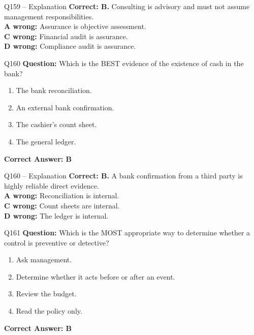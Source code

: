 \documentclass[aspectratio=169,10pt]{beamer}
\begin{document}
	\begin{frame}[t]{Q159 -- Explanation}
		\small
		\textbf{Correct: B.} Consulting is advisory and must not assume management responsibilities. \\[4pt]
		\textbf{A wrong:} Assurance is objective assessment. \\[2pt]
		\textbf{C wrong:} Financial audit is assurance. \\[2pt]
		\textbf{D wrong:} Compliance audit is assurance.
	\end{frame}
	
	\begin{frame}[t]{Q160}
		\small
		\textbf{Question:} Which is the BEST evidence of the existence of cash in the bank?
		\begin{enumerate}[label=\Alph*.,itemsep=1pt,topsep=2pt]
			\item The bank reconciliation.
			\item An external bank confirmation.
			\item The cashier's count sheet.
			\item The general ledger.
		\end{enumerate}
		\vspace{4pt}
		\textbf{Correct Answer: B}
	\end{frame}
	
	\begin{frame}[t]{Q160 -- Explanation}
		\small
		\textbf{Correct: B.} A bank confirmation from a third party is highly reliable direct evidence. \\[4pt]
		\textbf{A wrong:} Reconciliation is internal. \\[2pt]
		\textbf{C wrong:} Count sheets are internal. \\[2pt]
		\textbf{D wrong:} The ledger is internal.
	\end{frame}
	
	\begin{frame}[t]{Q161}
		\small
		\textbf{Question:} Which is the MOST appropriate way to determine whether a control is preventive or detective?
		\begin{enumerate}[label=\Alph*.,itemsep=1pt,topsep=2pt]
			\item Ask management.
			\item Determine whether it acts before or after an event.
			\item Review the budget.
			\item Read the policy only.
		\end{enumerate}
		\vspace{4pt}
		\textbf{Correct Answer: B}
	\end{frame}
	
\end{document}
